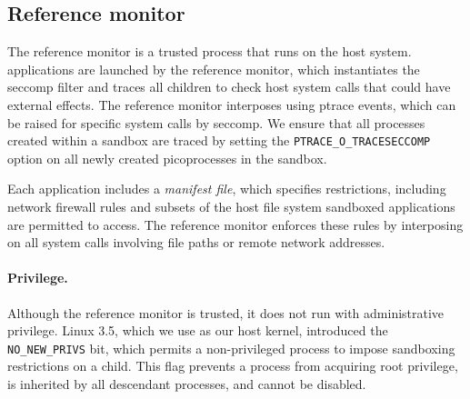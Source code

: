\subsection{Reference monitor}
\label{sec:linux:security:monitor}

The reference monitor is a trusted process that runs on the host system.
\graphene{} applications are launched by the reference monitor,
which instantiates the seccomp filter and traces all children
to check host system calls that could have external effects.
The reference monitor interposes using ptrace events, 
which can be raised for specific system calls by seccomp.
We ensure that all processes created within a sandbox are traced
by setting the {\tt PTRACE\_O\_TRACESECCOMP} option on all newly created picoprocesses
in the sandbox.


Each application includes a \emph{manifest file}, which specifies restrictions,
including network firewall rules and subsets of the host file system sandboxed
applications are permitted to access.  The reference monitor enforces these
rules by interposing on all system calls involving file paths or remote network addresses.

\paragraph{Privilege.~} 
Although the reference monitor is trusted, it does not run 
with administrative privilege.
Linux 3.5, which we use as our host kernel, 
introduced the {\tt NO\_NEW\_PRIVS} bit, which permits
a non-privileged process to impose sandboxing restrictions on a child.
This flag prevents a process from acquiring root privilege, %
is inherited by all descendant processes,
and cannot be disabled.

